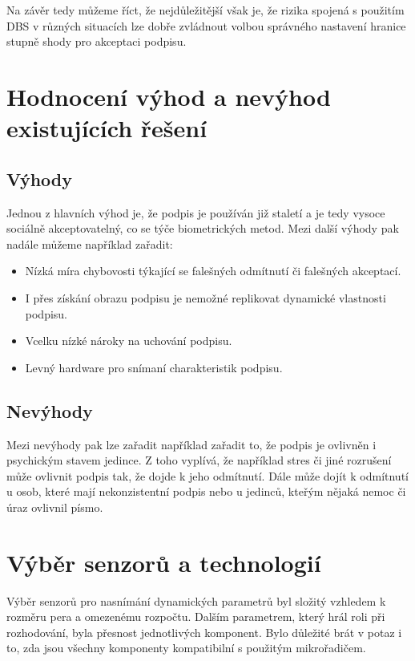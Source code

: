 Na závěr tedy můžeme říct, že nejdůležitější však je, že rizika spojená s použitím DBS v různých situacích lze dobře 
zvládnout volbou správného nastavení hranice stupně shody pro akceptaci podpisu. %

\section{Hodnocení výhod a nevýhod existujících řešení}
\subsection*{Výhody}
Jednou z hlavních výhod je, že podpis je používán již staletí a je tedy vysoce sociálně akceptovatelný, co se týče biometrických metod.
Mezi další výhody pak nadále můžeme například zařadit:

\begin{itemize}
  \item Nízká míra chybovosti týkající se falešných odmítnutí či falešných akceptací.
  \item I přes získání obrazu podpisu je nemožné replikovat dynamické vlastnosti podpisu.
  \item Vcelku nízké nároky na uchování podpisu.
  \item Levný hardware pro snímaní charakteristik podpisu.
\end{itemize}

\subsection*{Nevýhody}
Mezi nevýhody pak lze zařadit například zařadit to, že podpis je ovlivněn i psychickým stavem jedince.
Z toho vyplívá, že například stres či jiné rozrušení může ovlivnit podpis tak, že dojde k jeho odmítnutí.
Dále může dojít k odmítnutí u osob, které mají nekonzistentní podpis nebo u jedinců, kteřým nějaká nemoc či úraz ovlivnil písmo.

\section{Výběr senzorů a technologií}
Výběr senzorů pro nasnímání dynamických parametrů byl složitý vzhledem k rozměru pera a omezenému rozpočtu. %
Dalším parametrem, který hrál roli při rozhodování, byla přesnost jednotlivých komponent.                   %
Bylo důležité brát v potaz i to, zda jsou všechny komponenty kompatibilní s použitým mikrořadičem.          %

